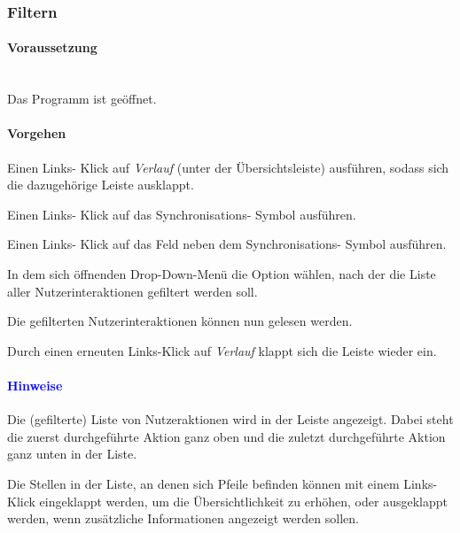 \documentclass[enabledeprecatedfontcommands,fontsize=11pt,paper=a4,twoside]{scrartcl}
\newcounter{one}
\newcounter{two}[one]
\newcommand*{\hint}{\paragraph{\textcolor{blue}{Hinweise}}}
\newcommand*{\condition}{\paragraph{Voraussetzung}$\;$ \vspace{0.2cm}\\}
\newcommand*{\action}{\paragraph{Vorgehen}}
\let\tempone\itemize
\let\temptwo\enditemize
\renewenvironment{itemize}{\tempone\addtolength{\itemsep}{-10.0pt}}{\temptwo}
\let\origenumerate\enumerate
\let\origendenumerate\endenumerate
\renewenvironment{enumerate}{\origenumerate \addtolength{\itemsep}{-10.0pt}}{\origendenumerate}
\begin{document}
\subsubsection{Filtern}
	\condition 
	Das Programm ist geöffnet.
	\action
	\begin{enumerate}
		\item Einen Links- Klick auf \textit{Verlauf} (unter der Übersichtsleiste) ausführen, sodass sich die dazugehörige Leiste ausklappt.
		\item Einen Links- Klick auf das Synchronisations- Symbol ausführen.
		\item Einen Links- Klick auf das Feld neben dem Synchronisations- Symbol ausführen.
		\item In dem sich öffnenden Drop-Down-Menü die Option wählen, nach der die Liste aller Nutzerinteraktionen gefiltert werden soll.
		\item Die gefilterten Nutzerinteraktionen können nun gelesen werden. 
		\item Durch einen erneuten Links-Klick auf \textit{Verlauf} klappt sich die Leiste wieder ein.
	\end{enumerate} 
	\hint 
	\begin{itemize}
		\item Die (gefilterte) Liste von Nutzeraktionen wird in der Leiste angezeigt. Dabei steht die zuerst durchgeführte Aktion ganz oben und die zuletzt durchgeführte Aktion ganz unten in der Liste.
		\item Die Stellen in der Liste, an denen sich Pfeile befinden können mit einem Links-Klick eingeklappt werden, um die Übersichtlichkeit zu erhöhen, oder ausgeklappt werden, wenn zusätzliche Informationen angezeigt werden sollen.
	\end{itemize}

	\begin{figure}[ht!]
		\centering
	
	\end{figure}
\end{document}
